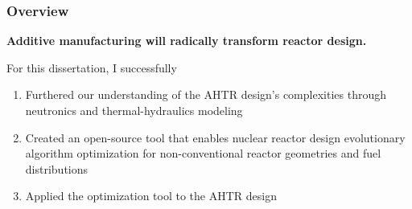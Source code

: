 \begin{frame}
    \frametitle{Overview}
    \textbf{Additive manufacturing will radically transform reactor design.}
    \vspace{0.5cm}

    For this dissertation, I successfully
    \begin{enumerate}
        \item Furthered our understanding of the \gls{AHTR} design's complexities 
        through neutronics and thermal-hydraulics modeling 
        \item Created an open-source tool that enables nuclear reactor design 
        evolutionary algorithm optimization for non-conventional reactor geometries and fuel 
        distributions
        \item Applied the optimization tool to the \gls{AHTR} design 
    \end{enumerate}

\end{frame}